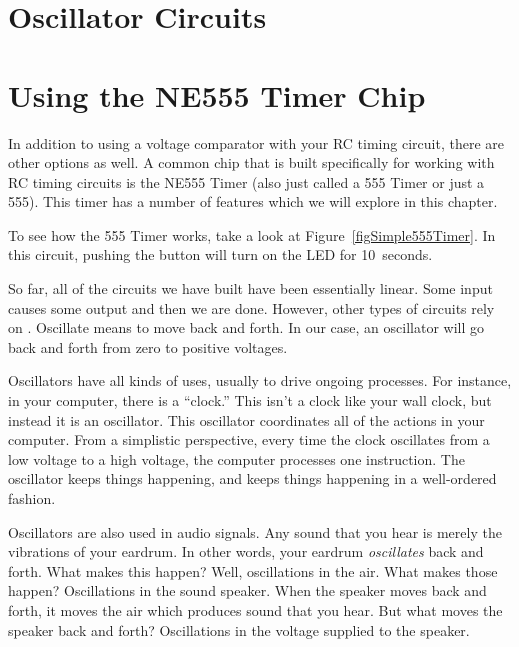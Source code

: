 \section{Oscillator Circuits}
\label{chapOscillators}

\section{Using the NE555 Timer Chip}


In addition to using a voltage comparator with your RC timing circuit, there are other options as well.
A common chip that is built specifically for working with RC timing circuits is the NE555 Timer (also just called a 555 Timer or just a 555).
This timer has a number of features which we will explore in this chapter.

To see how the 555 Timer works, take a look at Figure~\ref{figSimple555Timer}.
In this circuit, pushing the button will turn on the LED for 10~seconds.




So far, all of the circuits we have built have been essentially linear.
Some input causes some output and then we are done.
However, other types of circuits rely on .
Oscillate means to move back and forth.
In our case, an oscillator will go back and forth from zero to positive voltages.

Oscillators have all kinds of uses, usually to drive ongoing processes.
For instance, in your computer, there is a ``clock.''
This isn't a clock like your wall clock, but instead it is an oscillator.
This oscillator coordinates all of the actions in your computer.
From a simplistic perspective, every time the clock oscillates from a low voltage to a high voltage, the computer processes one instruction.
The oscillator keeps things happening, and keeps things happening in a well-ordered fashion.

Oscillators are also used in audio signals.  
Any sound that you hear is merely the vibrations of your eardrum.
In other words, your eardrum \emph{oscillates} back and forth.
What makes this happen?
Well, oscillations in the air.
What makes those happen?
Oscillations in the sound speaker.
When the speaker moves back and forth, it moves the air which produces sound that you hear.
But what moves the speaker back and forth?
Oscillations in the voltage supplied to the speaker.

